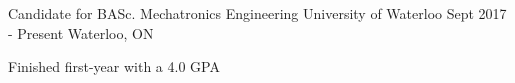 \begin{cventries}
  \cventry
    {Candidate for BASc. Mechatronics Engineering}
    {University of Waterloo}
    {Sept 2017 - Present}
    {Waterloo, ON}
    {
      \begin{cvitems}
        \item {Finished first-year with a 4.0 GPA}
      \end{cvitems}
    }
\end{cventries}

